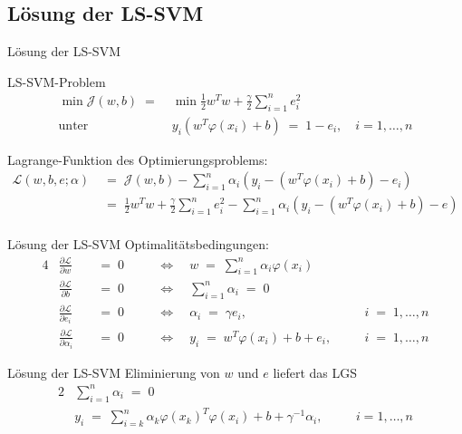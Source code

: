 \documentclass{beamer}
\begin{document}
{\begin{frame}
\end{frame}

\subsection{Lösung der LS-SVM}

\begin{frame}{Lösung der LS-SVM}
	\begin{block}{LS-SVM-Problem}
		\begin{align}
			\min \mathcal{J}(w,b)\;=\;&\min\frac{1}{2}w^Tw+\frac{\gamma}{2}\sum_{i=1}^{n}e_i^2\\
			\text{unter}\quad&y_i\left(w^T\varphi(x_i)+b\right)\;=\;1-e_i,\quad i=1,\dots,n
		\end{align}
	\end{block}
	Lagrange-Funktion des Optimierungsproblems:
	\begin{align}
		\mathcal{L}(w,b,e;\alpha)&\;=\;\mathcal{J}(w,b)-\sum_{i=1}^{n}\alpha_i\left(y_i-\left(w^T\varphi(x_i)+b\right)-e_i\right)\\
		&\;=\;\frac{1}{2}w^Tw+\frac{\gamma}{2}\sum_{i=1}^{n}e_i^2-\sum_{i=1}^{n}\alpha_i\left(y_i-\left(w^T\varphi(x_i)+b\right)-e\right)\\
	\end{align}
\end{frame}

\begin{frame}{Lösung der LS-SVM}
	Optimalitätsbedingungen:
	\begin{alignat}{4}
		& \frac{\partial \mathcal{L}}{\partial w} &&\;=\;0 && \quad\Leftrightarrow\quad w\;=\;\sum_{i=1}^{n}\alpha_i\varphi(x_i) && \\[0,3cm]
		& \frac{\partial \mathcal{L}}{\partial b} &&\;=\;0 && \quad\Leftrightarrow\quad \sum_{i=1}^{n}\alpha_i\;=\;0 && \\[0,3cm]
		& \frac{\partial \mathcal{L}}{\partial e_i} &&\;=\;0 && \quad\Leftrightarrow\quad \alpha_i\;=\;\gamma e_i, && i\;=\;1,\dots,n\\[0,3cm]
		& \frac{\partial \mathcal{L}}{\partial \alpha_i} &&\;=\;0 && \quad\Leftrightarrow\quad y_i\;=\;w^T\varphi(x_i)+b+e_i,\quad && i\;=\;1,\dots,n
	\end{alignat}
\end{frame}

\begin{frame}{Lösung der LS-SVM}
	Eliminierung von $w$ und $e$ liefert das LGS
	\begin{alignat}{2}
		&\sum_{i=1}^{n}\alpha_i \;=\;0 && \\
		&y_i\;=\;\sum_{i=k}^{n}\alpha_k\varphi(x_k)^T\varphi(x_i)+b+\gamma^{-1}\alpha_i,\quad && i=1,\dots,n
	\end{alignat}
\end{frame}

}
\end{document}
